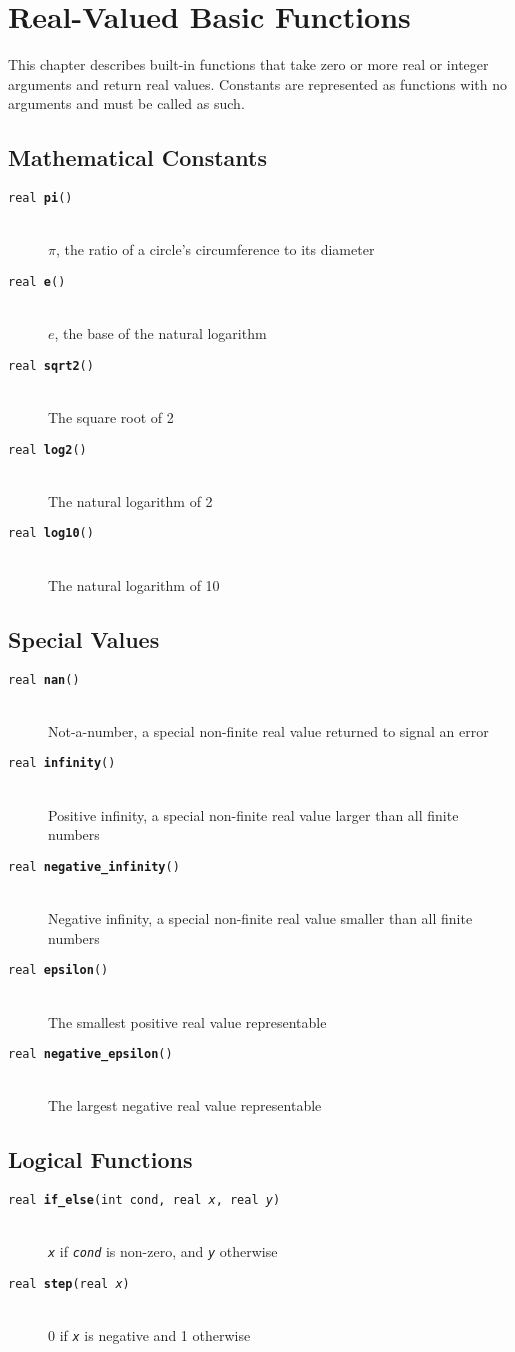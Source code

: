 \documentclass[10pt]{report}
\newcommand{\fitem}[4]{\item[{\tt #1 {\bfseries #2}(#3)}]\mbox{ } \\[4pt] #4}
\newcommand{\farg}[1]{{\tt\slshape #1}}
\begin{document}
\chapter{Real-Valued Basic Functions}

This chapter describes built-in functions that take zero or more real
or integer arguments and return real values.  Constants are
represented as functions with no arguments and must be called as such.

\section{Mathematical Constants}

%
\begin{description}
%
\fitem{real}{pi}{}{
  $\pi$, the ratio of a circle's circumference to its diameter}
%
\fitem{real}{e}{}{
 $e$, the base of the natural logarithm}
%
\fitem{real}{sqrt2}{}{
The square root of 2}
%
\fitem{real}{log2}{}{
The natural logarithm of 2}
%
\fitem{real}{log10}{}{
The natural logarithm of 10}
%
\end{description}

\section{Special Values}

\begin{description}
\fitem{real}{nan}{}{
Not-a-number, a special non-finite real value returned to signal an error}
%
\fitem{real}{infinity}{}{
 Positive infinity, a special non-finite real value larger than all
  finite numbers}
%
\fitem{real}{negative\_infinity}{}{ 
 Negative infinity, a special non-finite real value smaller than all
  finite numbers}
%
\fitem{real}{epsilon}{}{
The smallest positive real value representable}
%
\fitem{real}{negative\_epsilon}{}{
The largest negative real value representable}
%
\end{description}

\section{Logical Functions}

\begin{description}
%
\fitem{real}{if\_else}{int cond, real \farg{x}, real \farg{y}}{
\farg{x} if \farg{cond} is non-zero, and \farg{y} otherwise}
%
\fitem{real}{step}{real \farg{x}}{
0 if \farg{x} is negative and 1 otherwise}
%
\end{description}
\end{document}
